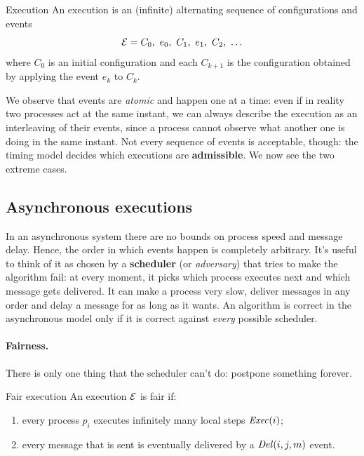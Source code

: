 \begin{frameddefn}{Execution}
  An execution is an (infinite) alternating sequence of configurations and events
  \[\mathcal{E} = C_0,\ e_0,\ C_1,\ e_1,\ C_2,\ \ldots\]
  where $C_0$ is an initial configuration and each $C_{k+1}$ is the configuration obtained by applying the event $e_k$ to $C_k$.
\end{frameddefn}

We observe that events are \textit{atomic} and happen one at a time: even if in reality two processes act at the same instant, we can always describe the execution as an interleaving of their events, since a process cannot observe what another one is doing in the same instant. Not every sequence of events is acceptable, though: the timing model decides which executions are \textbf{admissible}. We now see the two extreme cases.

\subsection{Asynchronous executions}

In an asynchronous system there are no bounds on process speed and message delay. Hence, the order in which events happen is completely arbitrary. It's useful to think of it as chosen by a \textbf{scheduler} (or \textit{adversary}) that tries to make the algorithm fail: at every moment, it picks which process executes next and which message gets delivered. It can make a process very slow, deliver messages in any order and delay a message for as long as it wants. An algorithm is correct in the asynchronous model only if it is correct against \textit{every} possible scheduler.

\paragraph{Fairness.} There is only one thing that the scheduler can't do: postpone something forever.

\begin{frameddefn}{Fair execution}
  An execution $\mathcal{E}$ is fair if:
  \begin{enumerate}
    \item every process $p_i$ executes infinitely many local steps $\mathit{Exec}(i)$;
    \item every message that is sent is eventually delivered by a $\mathit{Del}(i,j,m)$ event.
  \end{enumerate}
\end{frameddefn}

